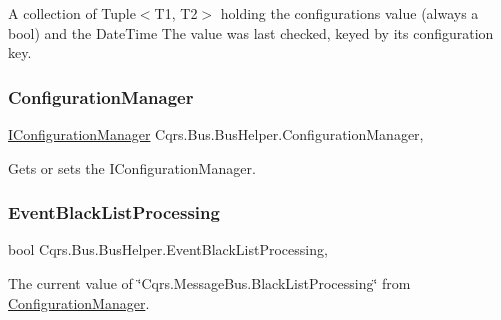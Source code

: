 A collection of Tuple$<$\+T1, T2$>$ holding the configurations value (always a bool) and the Date\+Time The value was last checked, keyed by it\textquotesingle{}s configuration key. 

\mbox{\label{classCqrs_1_1Bus_1_1BusHelper_aff0eaa0679d808e268ab4b5fb669bac8_aff0eaa0679d808e268ab4b5fb669bac8}} 
\subsubsection{\texorpdfstring{Configuration\+Manager}{ConfigurationManager}}
{\footnotesize\ttfamily \hyperlink{interfaceCqrs_1_1Configuration_1_1IConfigurationManager}{I\+Configuration\+Manager} Cqrs.\+Bus.\+Bus\+Helper.\+Configuration\+Manager\hspace{0.3cm}{\ttfamily [get]}, {\ttfamily [protected]}}



Gets or sets the I\+Configuration\+Manager. 

\mbox{\label{classCqrs_1_1Bus_1_1BusHelper_ae8d3525369ee9572de06f935cc09510b_ae8d3525369ee9572de06f935cc09510b}} 
\subsubsection{\texorpdfstring{Event\+Black\+List\+Processing}{EventBlackListProcessing}}
{\footnotesize\ttfamily bool Cqrs.\+Bus.\+Bus\+Helper.\+Event\+Black\+List\+Processing\hspace{0.3cm}{\ttfamily [get]}, {\ttfamily [protected]}}



The current value of \char`\"{}\+Cqrs.\+Message\+Bus.\+Black\+List\+Processing\char`\"{} from \hyperlink{classCqrs_1_1Bus_1_1BusHelper_aff0eaa0679d808e268ab4b5fb669bac8_aff0eaa0679d808e268ab4b5fb669bac8}{Configuration\+Manager}. 

